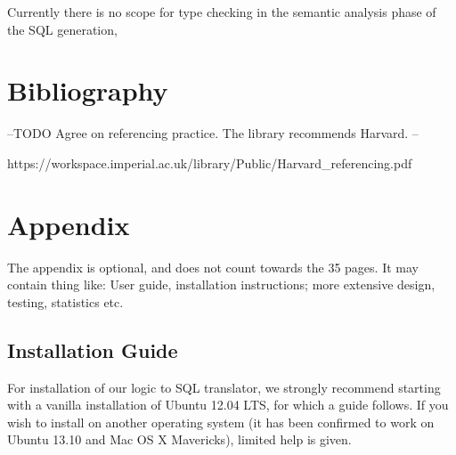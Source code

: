 \documentclass[a4paper, 11pt]{article}
\begin{document}
    Currently there is no scope for type checking in the semantic analysis phase
    of the SQL generation,

   
    

\section{Bibliography}
  \printbibliography

  --TODO Agree on referencing practice. The library recommends Harvard. --

  https://workspace.imperial.ac.uk/library/Public/Harvard\_referencing.pdf

\appendix
\section{Appendix}
  The appendix is optional, and does not count towards the 35 pages. It may
  contain thing like: User guide, installation instructions; more extensive
  design, testing, statistics etc.

  \subsection{Installation Guide}
    For installation of our logic to SQL translator, we strongly recommend
    starting with a vanilla installation of Ubuntu 12.04 LTS, for which a guide
    follows. If you wish to install on another operating system (it has been 
    confirmed to work on Ubuntu 13.10 and Mac OS X Mavericks),
    limited help is given.
\end{document}
